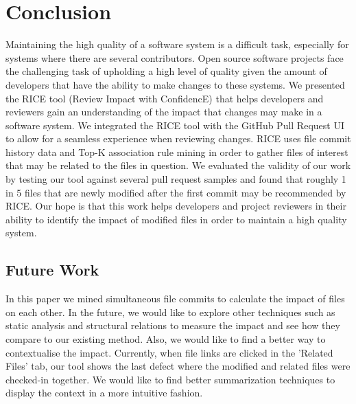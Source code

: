 
\section{Conclusion}
\label{sec:conclusion}

Maintaining the high quality of a software system is a difficult task, especially for systems where there are several contributors. Open source software projects face the challenging task of upholding a high level of quality given the amount of developers that have the ability to make changes to these systems. We presented the RICE tool (Review Impact with ConfidencE) that helps developers and reviewers gain an understanding of the impact that changes may make in a software system. We integrated the RICE tool with the GitHub Pull Request UI to allow for a seamless experience when reviewing changes. RICE uses file commit history data and Top-K association rule mining in order to gather files of interest that may be related to the files in question. We evaluated the validity of our work by testing our tool against several pull request samples and found that roughly 1 in 5 files that are newly modified after the first commit may be recommended by RICE. Our hope is that this work helps developers and project reviewers in their ability to identify the impact of modified files in order to maintain a high quality system.\\
\subsection{Future Work}
In this paper we mined simultaneous file commits to calculate the impact of files on each other. In the future, we would like to explore other techniques such as static analysis and structural relations to measure the impact and see how they compare to our existing method. Also, we would like to find a better way to contextualise the impact. Currently, when file links are clicked in the 'Related Files' tab, our tool shows the last defect where the modified and related files were checked-in together. We would like to find better summarization techniques to display the context in a more intuitive fashion.


